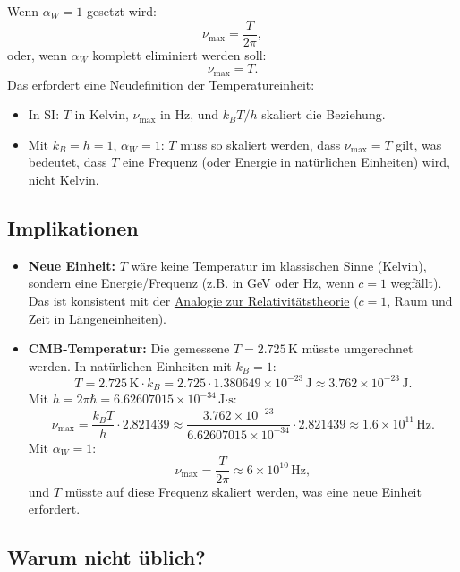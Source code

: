 \documentclass[12pt,a4paper]{article}
\begin{document}
	Wenn $\alpha_W = 1$ gesetzt wird:
	\[
	\nu_{\text{max}} = \frac{T}{2\pi},
	\]
	oder, wenn $\alpha_W$ komplett eliminiert werden soll:
	\[
	\nu_{\text{max}} = T.
	\]
	Das erfordert eine Neudefinition der Temperatureinheit:
	\begin{itemize}
		\item In SI: $T$ in Kelvin, $\nu_{\text{max}}$ in Hz, und $k_B T / h$ skaliert die Beziehung.
		\item Mit $k_B = h = 1$, $\alpha_W = 1$: $T$ muss so skaliert werden, dass $\nu_{\text{max}} = T$ gilt, was bedeutet, dass $T$ eine Frequenz (oder Energie in natürlichen Einheiten) wird, nicht Kelvin.
	\end{itemize}
	
	\subsection{Implikationen}
	
	\begin{itemize}
		\item \textbf{Neue Einheit:} $T$ wäre keine Temperatur im klassischen Sinne (Kelvin), sondern eine Energie/Frequenz (z.B. in GeV oder Hz, wenn $c = 1$ wegfällt). Das ist konsistent mit der \href{https://github.com/jpascher/T0-Time-Mass-Duality/tree/main/2/pdf/Deutsch/Eine neue Perspektive auf Zeit und Raum Johann Paschers revolutionäre Ideen.pdf}{Analogie zur Relativitätstheorie} ($c = 1$, Raum und Zeit in Längeneinheiten).
		\item \textbf{CMB-Temperatur:} Die gemessene $T = 2.725 \, \text{K}$ müsste umgerechnet werden. In natürlichen Einheiten mit $k_B = 1$:
		\[
		T = 2.725 \, \text{K} \cdot k_B = 2.725 \cdot 1.380649 \times 10^{-23} \, \text{J} \approx 3.762 \times 10^{-23} \, \text{J}.
		\]
		Mit $h = 2\pi \hbar = 6.62607015 \times 10^{-34} \, \text{J·s}$:
		\[
		\nu_{\text{max}} = \frac{k_B T}{h} \cdot 2.821439 \approx \frac{3.762 \times 10^{-23}}{6.62607015 \times 10^{-34}} \cdot 2.821439 \approx 1.6 \times 10^{11} \, \text{Hz}.
		\]
		Mit $\alpha_W = 1$:
		\[
		\nu_{\text{max}} = \frac{T}{2\pi} \approx 6 \times 10^{10} \, \text{Hz},
		\]
		und $T$ müsste auf diese Frequenz skaliert werden, was eine neue Einheit erfordert.
	\end{itemize}
	
	\subsection{Warum nicht üblich?}
	
\end{document}

